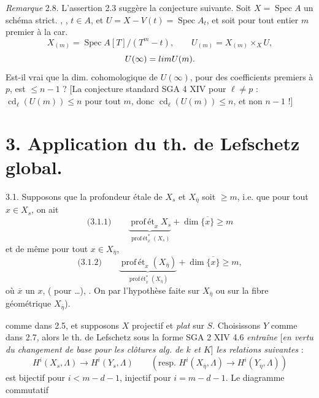 \documentclass[11pt,a4paper]{article}
\begin{document}
\emph{Remarque} 2.8. L'assertion 2.3 suggère la \struck{\ill{}} conjecture suivante. Soit $X = \operatorname{Spec} A$ un schéma strict. , , $t \in A$, \struck{\ill{}} et $U = X - V(t) = \operatorname{Spec} A_t$, et soit pour tout entier $m$ premier à la car.
\[
X_{(m)} = \operatorname{Spec} A[T]/(T^m - t) , \qquad U_{(m)} = X_{(m)} \times_X U ,
\]
\[
U(\infty) = \varprojlim U(m) .
\]
Est-il vrai que la dim. cohomologique de $U(\infty)$, pour des coefficients premiers à \struck{\ill{}} $p$, \struck{\ill{}} est $\leqslant n - 1$ ? [La conjecture standard SGA 4 XIV \ill{} \struck{\ill{}} \struck{\ill{}} pour $\ell \neq p$ : $\operatorname{cd}_\ell(U(m)) \leqslant n$ pour tout $m$, donc $\operatorname{cd}_\ell(U(m)) \leqslant n$, et non $n - 1$ !]


\section*{3. Application du th. de Lefschetz  \struck{\ill{}} global.}

 3.1. Supposons que la profondeur étale   de $X_s$ et $X_{\overline{\eta}}$ soit $\geqslant m$, i.e. que pour tout $x \in X_s$, on ait
\[
\text{(3.1.1)} \qquad \underbrace{\operatorname{prof\,ét}_x X_s}_{\operatorname{prof\,ét}^*_x(X_s)} + \dim \overline{\{x\}} \geqslant m
\]
et de même pour tout $x \in X_{\overline{\eta}}$,
\[
\text{(3.1.2)} \qquad \underbrace{\operatorname{prof\,ét}_x (X_{\overline{\eta}})}_{\operatorname{prof\,ét}^*_x(X_{\overline{\eta}})} + \dim \overline{\{x\}} \geqslant m ,
\]
où $\overline{x}$  un    $x$, \struck{\ill{}} ( pour  …), \uncertain{\ill{}}. On  \ill{} \ill{}
par l'hypothèse faite sur $X_{\overline{\eta}}$ ou \struck{\ill{}} \add{\ill{}} sur la fibre géométrique $X_{\overline{\eta}}$). 

  comme dans 2.5, et supposons  $X$ projectif et \emph{plat} sur $S$. Choisissons $Y$ comme dans 2.7, alors le th. de Lefschetz  \struck{\ill{}} sous la forme SGA 2 XIV 4.6 \emph{entraîne} [\emph{en vertu du changement de base} \struck{\ill{}} \emph{pour les clôtures alg. de $k$ et $K$}] \emph{les relations suivantes} : 
\[
H^i(X_s, \Lambda) \longrightarrow H^i(Y_s, \Lambda) \qquad (\text{resp. } H^i(X_{\overline{\eta}}, \Lambda) \to H^i(Y_{\overline{\eta}}, \Lambda))
\]
est bijectif pour $i < m - d - 1$, injectif pour $i = m - d - 1$. Le diagramme commutatif
\end{document}
